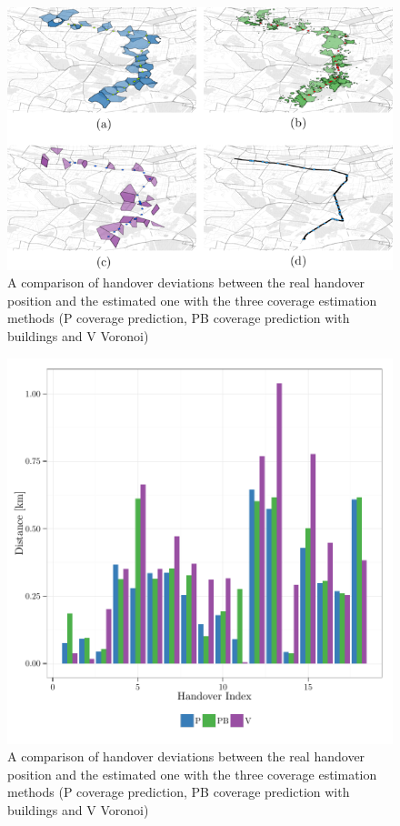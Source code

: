 \documentclass[twocolumn]{bmcart}%
\begin{document}
\begin{backmatter}
\begin{figure}[h!]
\label{fig:144}
  \caption{ A comparison of handover deviations between the real handover position and the estimated one with the three coverage estimation methods (P coverage prediction, PB coverage prediction with buildings and V Voronoi)
      }
      \includegraphics[height=0.40\textheight]{images/144standalone.png}
\end{figure}


\begin{figure}[h!]
\label{fig:handoverdeviation}
  \caption{ A comparison of handover deviations between the real handover position and the estimated one with the three coverage estimation methods (P coverage prediction, PB coverage prediction with buildings and V Voronoi)
      }
      \includegraphics[width=0.9\columnwidth]{images/563_HandoverDeviation}
\end{figure}



\end{backmatter}
\end{document}
